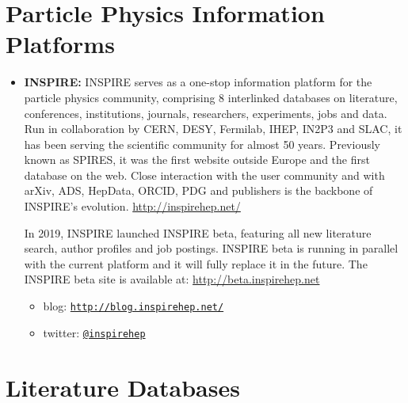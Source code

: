 \section{Particle Physics Information
Platforms}\label{particle-physics-information-platforms}

\begin{itemize}
\item
  \textbf{INSPIRE:} INSPIRE serves as a one-stop information platform
  for the particle physics community, comprising 8 interlinked databases
  on literature, conferences, institutions, journals, researchers,
  experiments, jobs and data. Run in collaboration by CERN, DESY,
  Fermilab, IHEP, IN2P3 and SLAC, it has been serving the scientific
  community for almost 50 years. Previously known as SPIRES, it was the
  first website outside Europe and the first database on the web. Close
  interaction with the user community and with arXiv, ADS, HepData,
  ORCID, PDG and publishers is the backbone of INSPIRE's evolution.
  \url{http://inspirehep.net/}

  In 2019, INSPIRE launched INSPIRE beta, featuring all new literature
  search, author profiles and job postings. INSPIRE beta is running in
  parallel with the current platform and it will fully replace it in the
  future. The INSPIRE beta site is available at:
  \url{http://beta.inspirehep.net}

  \begin{itemize}
  \tightlist
  \item
    blog:
    \href{http://blog.inspirehep.net/}{\texttt{http://blog.inspirehep.net/}}
  \item
    twitter: \href{https://twitter.com/inspirehep}{\texttt{@inspirehep}}
  \end{itemize}
\end{itemize}

\section{Literature Databases}\label{literature-databases}

